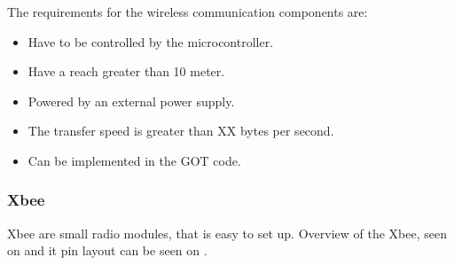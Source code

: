 The requirements for the wireless communication components are:
\begin{itemize}
\item Have to be controlled by the microcontroller.
\item Have a reach greater than 10 meter. 
\item Powered by an external power supply.
\item The transfer speed is greater than XX bytes per second. 
\item Can be implemented in the GOT code.
\end{itemize}

\subsubsection{Xbee}
Xbee are small radio modules, that is easy to set up. Overview of the Xbee, seen on  and it pin layout can be seen on .



